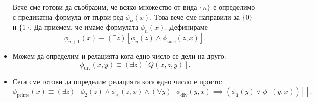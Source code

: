 \begin{example}
\begin{itemize}
    Вече сме готови да съобразим, че всяко множество от вида $\{n\}$
    е определимо с предикатна формула от първи ред $\phi_n(x)$.
    Това вече сме направили за $\{0\}$ и $\{1\}$.
    Да приемем, че имаме формулата $\phi_n(x)$. Дефинираме
    \[\phi_{n+1}(x) \equiv (\exists z)[\phi_n(z) \land \phi_{\text{succ}}(z,x)].\]
  \item
    Можем да определим и релацията кога едно число се дели на друго:
    \[\phi_{\text{div}}(x,y) \equiv (\exists z)[Q(x,z,y)].\]
  \item
    Сега сме готови да определим релацията кога едно число е просто:
    \[\phi_{\text{prime}}(x) \equiv (\exists z)[\phi_2(z) \land \phi_{\leq}(z,x) \land (\forall y)[\phi_{\text{div}}(y,x) \implies (\phi_1(y) \lor
    \phi_{=}(y,x))]].\]
  \end{itemize}
\end{example}

